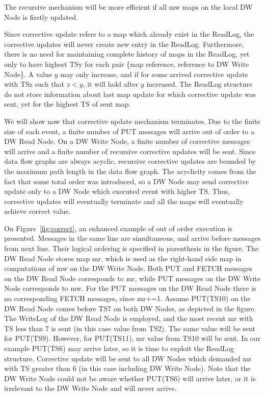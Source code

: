 \documentclass{sig-semester}
\begin{document}
The recursive mechanism will be more efficient if all mw maps on the local DW Node is firstly updated.

Since corrective update refers to a map which already exist in the ReadLog, the corrective updates will never create new entry in the ReadLog. Furthermore, there is no need for maintaining complete history of maps in the ReadLog, yet only to have highest TSy for each pair \{map reference, reference to DW Write Node\}. A value $y$ may only increase, and if for some arrived corrective update with TSz such that $z<y$, it will hold after $y$ increased. The ReadLog structure do not store information about last map update for which corrective update was sent, yet for the highest TS of sent map.

We will show now that corrective update mechanism terminates. Due to the finite size of each event, a finite number of PUT messages will arrive out of order to a DW Read Node. On a DW Write Node, a finite number of corrective messages will arrive and a finite number of recursive corrective updates will be sent. Since data flow graphs are always acyclic, recursive corrective updates are bounded by the maximum path length in the data flow graph. The acyclicity comes from the fact that some total order was introduced, so a DW Node may send corrective update only to a DW Node which executed event with higher TS. Thus, corrective updates will eventually terminate and all the maps will eventually achieve correct value.
 
On Figure~\ref{fig:correct}, an enhanced example of out of order execution is presented. Messages in the same line are simultaneous, and arrive before messages from next line. Their logical ordering is specified in parenthesis in the figure. The DW Read Node stores map mr, which is used as the right-hand side map in computations of mw on the DW Write Node. Both PUT and FETCH messages on the DW Read Node corresponds to mr, while PUT messages on the DW Write Node corresponds to mw. For the PUT messages on the DW Read Node there is no corresponding FETCH messages, since mr+=1. Assume PUT(TS10) on the DW Read Node comes before TS7 on both DW Nodes, as depicted in the figure. The WriteLog of the DW Read Node is employed, and the most recent mr with TS less than 7 is sent (in this case value from TS2). The same value will be sent for PUT(TS9). However, for PUT(TS11), mr value from TS10 will be sent. In our example PUT(TS6) may arrive later, so it is time to exploit the ReadLog structure. Corrective update will be sent to all DW Nodes which demanded mr with TS greater than 6 (in this case including DW Write Node). Note that the DW Write Node could not be aware whether PUT(TS6) will arrive later, or it is irrelevant to the DW Write Node and will never arrive.
\end{document}
